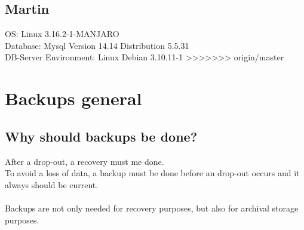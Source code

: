 \documentclass[10pt]{article}
\begin{document}
\subsection{Martin}
OS: Linux 3.16.2-1-MANJARO\\
Database: Mysql Version 14.14 Distribution 5.5.31\\
DB-Server Environment: Linux Debian 3.10.11-1
>>>>>>> origin/master
\newpage
\newpage
\section{Backups general}
\subsection{Why should backups be done?}
After a drop-out, a recovery must me done. \\
To avoid a loss of data, a backup must be done before an drop-out occurs and it always should be current. \\ \\
Backups are not only needed for recovery purposes, but also for archival storage purposes.
\end{document}

